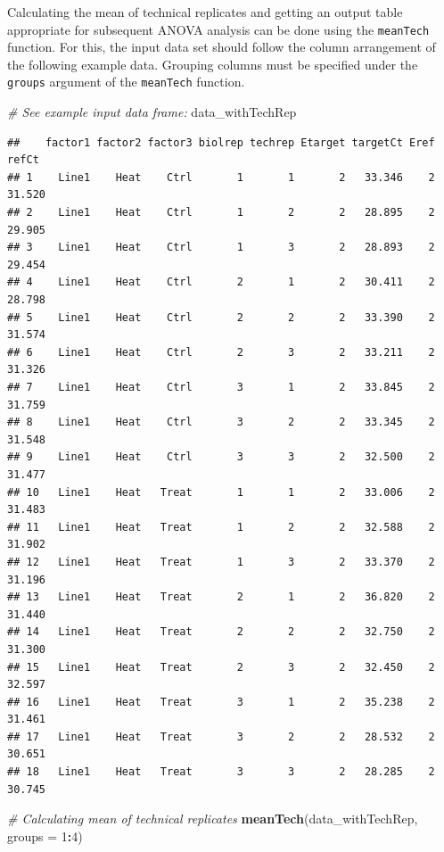 \documentclass[
]{article}
\newenvironment{Shaded}{\begin{snugshade}}{\end{snugshade}}
\newcommand{\AttributeTok}[1]{\textcolor[rgb]{0.13,0.29,0.53}{#1}}
\newcommand{\CommentTok}[1]{\textcolor[rgb]{0.56,0.35,0.01}{\textit{#1}}}
\newcommand{\DecValTok}[1]{\textcolor[rgb]{0.00,0.00,0.81}{#1}}
\newcommand{\FunctionTok}[1]{\textcolor[rgb]{0.13,0.29,0.53}{\textbf{#1}}}
\newcommand{\NormalTok}[1]{#1}
\newcommand{\SpecialCharTok}[1]{\textcolor[rgb]{0.81,0.36,0.00}{\textbf{#1}}}
\begin{document}
Calculating the mean of technical replicates and getting an output table
appropriate for subsequent ANOVA analysis can be done using the
\texttt{meanTech} function. For this, the input data set should follow
the column arrangement of the following example data. Grouping columns
must be specified under the \texttt{groups} argument of the
\texttt{meanTech} function.

\begin{Shaded}
\begin{Highlighting}[]
\CommentTok{\# See example input data frame:}
\NormalTok{data\_withTechRep}
\end{Highlighting}
\end{Shaded}

\begin{verbatim}
##    factor1 factor2 factor3 biolrep techrep Etarget targetCt Eref  refCt
## 1    Line1    Heat    Ctrl       1       1       2   33.346    2 31.520
## 2    Line1    Heat    Ctrl       1       2       2   28.895    2 29.905
## 3    Line1    Heat    Ctrl       1       3       2   28.893    2 29.454
## 4    Line1    Heat    Ctrl       2       1       2   30.411    2 28.798
## 5    Line1    Heat    Ctrl       2       2       2   33.390    2 31.574
## 6    Line1    Heat    Ctrl       2       3       2   33.211    2 31.326
## 7    Line1    Heat    Ctrl       3       1       2   33.845    2 31.759
## 8    Line1    Heat    Ctrl       3       2       2   33.345    2 31.548
## 9    Line1    Heat    Ctrl       3       3       2   32.500    2 31.477
## 10   Line1    Heat   Treat       1       1       2   33.006    2 31.483
## 11   Line1    Heat   Treat       1       2       2   32.588    2 31.902
## 12   Line1    Heat   Treat       1       3       2   33.370    2 31.196
## 13   Line1    Heat   Treat       2       1       2   36.820    2 31.440
## 14   Line1    Heat   Treat       2       2       2   32.750    2 31.300
## 15   Line1    Heat   Treat       2       3       2   32.450    2 32.597
## 16   Line1    Heat   Treat       3       1       2   35.238    2 31.461
## 17   Line1    Heat   Treat       3       2       2   28.532    2 30.651
## 18   Line1    Heat   Treat       3       3       2   28.285    2 30.745
\end{verbatim}

\begin{Shaded}
\begin{Highlighting}[]
\CommentTok{\# Calculating mean of technical replicates}
\FunctionTok{meanTech}\NormalTok{(data\_withTechRep, }\AttributeTok{groups =} \DecValTok{1}\SpecialCharTok{:}\DecValTok{4}\NormalTok{)}
\end{Highlighting}
\end{Shaded}
\end{document}
